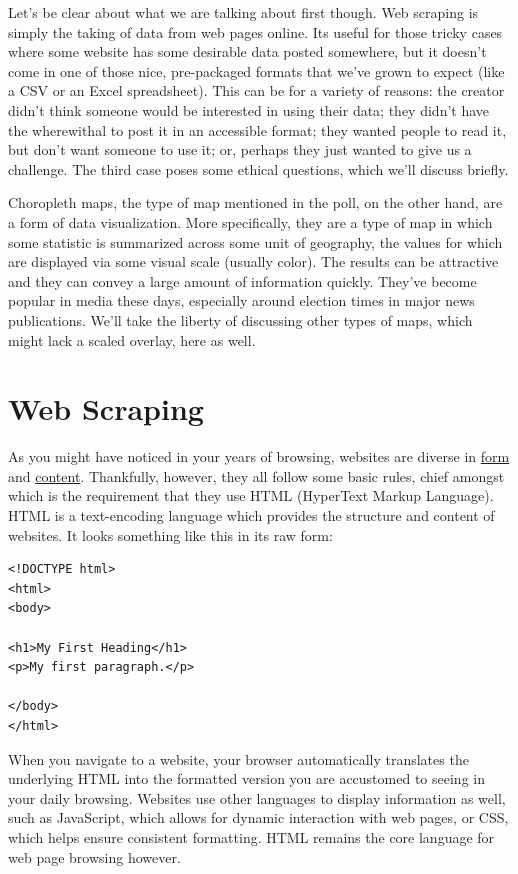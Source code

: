 \documentclass[
  letterpaper,
]{book}
\begin{document}
Let's be clear about what we are talking about first though. Web
scraping is simply the taking of data from web pages online. Its useful
for those tricky cases where some website has some desirable data posted
somewhere, but it doesn't come in one of those nice, pre-packaged
formats that we've grown to expect (like a CSV or an Excel spreadsheet).
This can be for a variety of reasons: the creator didn't think someone
would be interested in using their data; they didn't have the
wherewithal to post it in an accessible format; they wanted people to
read it, but don't want someone to use it; or, perhaps they just wanted
to give us a challenge. The third case poses some ethical questions,
which we'll discuss briefly.

Choropleth maps, the type of map mentioned in the poll, on the other
hand, are a form of data visualization. More specifically, they are a
type of map in which some statistic is summarized across some unit of
geography, the values for which are displayed via some visual scale
(usually color). The results can be attractive and they can convey a
large amount of information quickly. They've become popular in media
these days, especially around election times in major news publications.
We'll take the liberty of discussing other types of maps, which might
lack a scaled overlay, here as well.

\hypertarget{web-scraping}{%
\section{Web Scraping}\label{web-scraping}}

As you might have noticed in your years of browsing, websites are
diverse in \href{https://cat-bounce.com}{form} and
\href{https://pointerpointer.com/}{content}. Thankfully, however, they
all follow some basic rules, chief amongst which is the requirement that
they use HTML (HyperText Markup Language). HTML is a text-encoding
language which provides the structure and content of websites. It looks
something like this in its raw form:

\begin{verbatim}
<!DOCTYPE html>
<html>
<body>

<h1>My First Heading</h1>
<p>My first paragraph.</p>

</body>
</html>
\end{verbatim}

When you navigate to a website, your browser automatically translates
the underlying HTML into the formatted version you are accustomed to
seeing in your daily browsing. Websites use other languages to display
information as well, such as JavaScript, which allows for dynamic
interaction with web pages, or CSS, which helps ensure consistent
formatting. HTML remains the core language for web page browsing
however.
\end{document}

